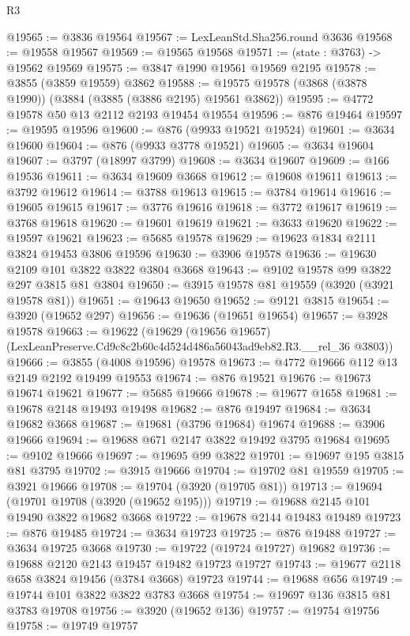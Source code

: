 \begin{lexlean}{R3}
\begin{coremodule}
@19565 := @3836 @19564
@19567 := LexLeanStd.Sha256.round @3636
@19568 := @19558 @19567
@19569 := @19565 @19568
@19571 := (state : @3763) -> @19562 @19569
@19575 := @3847 @1990 @19561 @19569 @2195
@19578 := @3855 (@3859 @19559) @3862
@19588 := @19575 @19578 (@3868 (@3878 @1990)) (@3884 (@3885 (@3886 @2195) @19561 @3862))
@19595 := @4772 @19578 @50 @13 @2112 @2193 @19454 @19554
@19596 := @876 @19464
@19597 := @19595 @19596
@19600 := @876 (@9933 @19521 @19524)
@19601 := @3634 @19600
@19604 := @876 (@9933 @3778 @19521)
@19605 := @3634 @19604
@19607 := @3797 (@18997 @3799)
@19608 := @3634 @19607
@19609 := @166 @19536
@19611 := @3634 @19609 @3668
@19612 := @19608 @19611
@19613 := @3792 @19612
@19614 := @3788 @19613
@19615 := @3784 @19614
@19616 := @19605 @19615
@19617 := @3776 @19616
@19618 := @3772 @19617
@19619 := @3768 @19618
@19620 := @19601 @19619
@19621 := @3633 @19620
@19622 := @19597 @19621
@19623 := @5685 @19578
@19629 := @19623 @1834 @2111 @3824 @19453 @3806 @19596
@19630 := @3906 @19578
@19636 := @19630 @2109 @101 @3822 @3822 @3804 @3668
@19643 := @9102 @19578 @99 @3822 @297 @3815 @81 @3804
@19650 := @3915 @19578 @81 @19559 (@3920 (@3921 @19578 @81))
@19651 := @19643 @19650
@19652 := @9121 @3815
@19654 := @3920 (@19652 @297)
@19656 := @19636 (@19651 @19654)
@19657 := @3928 @19578
@19663 := @19622
    (@19629 (@19656 @19657) (LexLeanPreserve.Cd9c8c2b60c4d524d486a56043ad9eb82.R3.__rel_36 @3803))
@19666 := @3855 (@4008 @19596) @19578
@19673 := @4772 @19666 @112 @13 @2149 @2192 @19499 @19553
@19674 := @876 @19521
@19676 := @19673 @19674 @19621
@19677 := @5685 @19666
@19678 := @19677 @1658
@19681 := @19678 @2148 @19493 @19498
@19682 := @876 @19497
@19684 := @3634 @19682 @3668
@19687 := @19681 (@3796 @19684) @19674
@19688 := @3906 @19666
@19694 := @19688 @671 @2147 @3822 @19492 @3795 @19684
@19695 := @9102 @19666
@19697 := @19695 @99 @3822
@19701 := @19697 @195 @3815 @81 @3795
@19702 := @3915 @19666
@19704 := @19702 @81 @19559
@19705 := @3921 @19666
@19708 := @19704 (@3920 (@19705 @81))
@19713 := @19694 (@19701 @19708 (@3920 (@19652 @195)))
@19719 := @19688 @2145 @101 @19490 @3822 @19682 @3668
@19722 := @19678 @2144 @19483 @19489
@19723 := @876 @19485
@19724 := @3634 @19723
@19725 := @876 @19488
@19727 := @3634 @19725 @3668
@19730 := @19722 (@19724 @19727) @19682
@19736 := @19688 @2120 @2143 @19457 @19482 @19723 @19727
@19743 := @19677 @2118 @658 @3824 @19456 (@3784 @3668) @19723
@19744 := @19688 @656
@19749 := @19744 @101 @3822 @3822 @3783 @3668
@19754 := @19697 @136 @3815 @81 @3783 @19708
@19756 := @3920 (@19652 @136)
@19757 := @19754 @19756
@19758 := @19749 @19757

\end{coremodule}
\end{lexlean}
